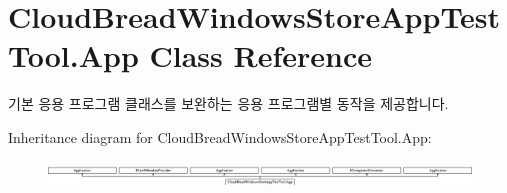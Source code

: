 \hypertarget{a00015}{}\section{Cloud\+Bread\+Windows\+Store\+App\+Test\+Tool.\+App Class Reference}
\label{a00015}


기본 응용 프로그램 클래스를 보완하는 응용 프로그램별 동작을 제공합니다.  


Inheritance diagram for Cloud\+Bread\+Windows\+Store\+App\+Test\+Tool.\+App\+:\begin{figure}[H]
\begin{center}
\leavevmode
\includegraphics[height=0.707071cm]{a00015}
\end{center}
\end{figure}
